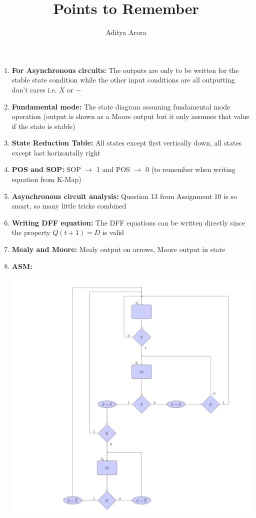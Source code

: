 \documentclass[10pt]{article}
\begin{document}
 
\title{Points to Remember}%
\author{Aditya Arora} %
\maketitle


\begin{enumerate}
\item \textbf{For Asynchronous circuits:} The outputs are only to be written for the stable state condition while the other input conditions are all outputting don't cares i.e. $X$ or $-$
\item \textbf{Fundamental mode:} The state diagram assuming fundamental mode operation (output is shown as a Moore output but it only assumes that value if the state is stable)
\item \textbf{State Reduction Table:} All states except first vertically down, all states except last horizontally right
\item \textbf{POS and SOP:} SOP $\rightarrow$ 1 and POS $\rightarrow$ 0 (to remember when writing equation from K-Map)
\item \textbf{Asynchronous circuit analysis:} Question 13 from Assignment 10 is so smart, so many little tricks combined
\item \textbf{Writing DFF equation:} The DFF equations can be written directly since the property $Q(t+1) = D$ is valid
\item \textbf{Mealy and Moore:} Mealy output on arrows, Moore output in state
\item \textbf{ASM: }\parbox{\linewidth}{
        \includegraphics[scale=0.5]{ASM.png}
}
\end{enumerate}
\end{document}
